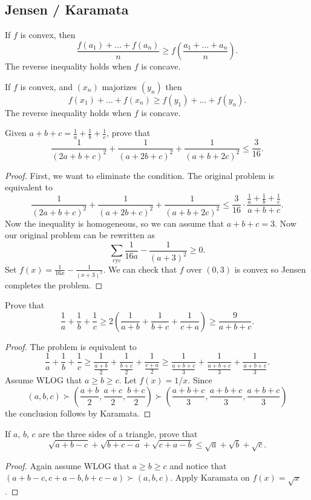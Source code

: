 \documentclass[11pt]{scrartcl}
\begin{document}
\subsection{Jensen / Karamata}
\begin{theorem}
   If $f$ is convex, then
  \[ \frac{f(a_1) + \dots + f(a_n)}{n} \ge f\left( \frac{a_1+\dots+a_n}{n} \right). \]
  The reverse inequality holds when $f$ is concave.
\end{theorem}
\begin{theorem}
   If $f$ is convex, and $(x_n)$ majorizes $(y_n)$ then
  \[ f(x_1) + \dots + f(x_n) \ge f(y_1) + \dots + f(y_n). \]
  The reverse inequality holds when $f$ is concave.
\end{theorem}
\begin{example}
  [Shortlist 2009] Given $a+b+c=\frac1a+\frac1b+\frac1c$, prove that
  \[ \frac{1}{(2a+b+c)^2}+\frac{1}{(a+2b+c)^2}+\frac{1}{(a+b+2c)^2}\leq\frac{3}{16}. \]
\end{example}
\begin{proof}
  First, we want to eliminate the condition.
  The original problem is equivalent to
  \[ \frac{1}{(2a+b+c)^2}+\frac{1}{(a+2b+c)^2}+\frac{1}{(a+b+2c)^2}\leq\frac{3}{16} \cdot \frac{\frac1a+\frac1b+\frac1c}{a+b+c}. \]
  Now the inequality is homogeneous, so we can assume that $a+b+c=3$.
  Now our original problem can be rewritten as
  \[ \sum_{\text{cyc}} \frac{1}{16a} - \frac{1}{(a+3)^2} \ge 0. \]
  Set $f(x) = \frac{1}{16x} - \frac{1}{(x+3)^2}$. We can check that $f$ over $(0,3)$ is convex so Jensen completes the problem.
\end{proof}
\begin{example}
  Prove that \[ \frac{1}{a}+\frac{1}{b}+\frac{1}{c} \geq
    2\left(\frac{1}{a+b}+\frac{1}{b+c}+\frac{1}{c+a}\right)
    \geq\frac{9}{a+b+c}. \]
\end{example}
\begin{proof}
  The problem is equivalent to
  \[ \frac{1}{a} + \frac{1}{b} + \frac{1}{c}
    \ge \frac{1}{\frac{a+b}{2}} + \frac{1}{\frac{b+c}{2}} + \frac{1}{\frac{c+a}{2}}
    \ge \frac{1}{\frac{a+b+c}{3}} + \frac{1}{\frac{a+b+c}{3}} + \frac{1}{\frac{a+b+c}{3}}. \]
  Assume WLOG that $a \ge b \ge c$. Let $f(x) = 1/x$. Since
  \[ (a,b,c) \succ \left( \frac{a+b}{2}, \frac{a+c}{2}, \frac{b+c}{2} \right) \succ \left( \frac{a+b+c}{3}, \frac{a+b+c}{3}, \frac{a+b+c}{3} \right) \]
  the conclusion follows by Karamata.
\end{proof}
\begin{example}
  [APMO 1996] If $a$, $b$, $c$ are the three sides of a triangle,
  prove that \[ \sqrt{a+b-c}+\sqrt{b+c-a}+\sqrt{c+a-b}\leq\sqrt{a}+\sqrt{b}+\sqrt{c}. \]
\end{example}
\begin{proof}
  Again assume WLOG that $a \ge b \ge c$ and notice that $(a+b-c,c+a-b,b+c-a) \succ (a,b,c)$. Apply Karamata on $f(x) = \sqrt x$.
\end{proof}
\end{document}
